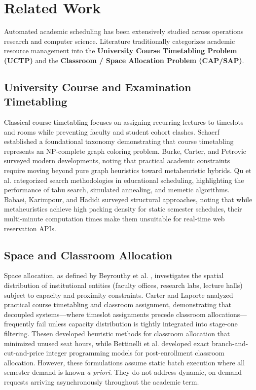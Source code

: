 \documentclass[conference]{IEEEtran}
\begin{document}
\section{Related Work}
Automated academic scheduling has been extensively studied across operations research and computer science. Literature traditionally categorizes academic resource management into the \textbf{University Course Timetabling Problem (UCTP)} and the \textbf{Classroom / Space Allocation Problem (CAP/SAP)}.

\subsection{University Course and Examination Timetabling}
Classical course timetabling focuses on assigning recurring lectures to timeslots and rooms while preventing faculty and student cohort clashes. Schaerf \cite{schaerf1999survey} established a foundational taxonomy demonstrating that course timetabling represents an NP-complete graph coloring problem. Burke, Carter, and Petrovic \cite{burke2002recent} surveyed modern developments, noting that practical academic constraints require moving beyond pure graph heuristics toward metaheuristic hybrids. Qu et al. \cite{qu2009survey} categorized search methodologies in educational scheduling, highlighting the performance of tabu search, simulated annealing, and memetic algorithms. Babaei, Karimpour, and Hadidi \cite{babaei2015survey} surveyed structural approaches, noting that while metaheuristics achieve high packing density for static semester schedules, their multi-minute computation times make them unsuitable for real-time web reservation APIs.

\subsection{Space and Classroom Allocation}
Space allocation, as defined by Beyrouthy et al. \cite{beyrouthy2006towards}, investigates the spatial distribution of institutional entities (faculty offices, research labs, lecture halls) subject to capacity and proximity constraints. Carter and Laporte \cite{carter1998recent} analyzed practical course timetabling and classroom assignment, demonstrating that decoupled systems---where timeslot assignments precede classroom allocations---frequently fail unless capacity distribution is tightly integrated into stage-one filtering. Thesen \cite{thesen1998heuristic} developed heuristic methods for classroom allocation that minimized unused seat hours, while Bettinelli et al. \cite{bettinelli2014optimization} developed exact branch-and-cut-and-price integer programming models for post-enrollment classroom allocation. However, these formulations assume static batch execution where all semester demand is known \textit{a priori}. They do not address dynamic, on-demand requests arriving asynchronously throughout the academic term.
\end{document}
